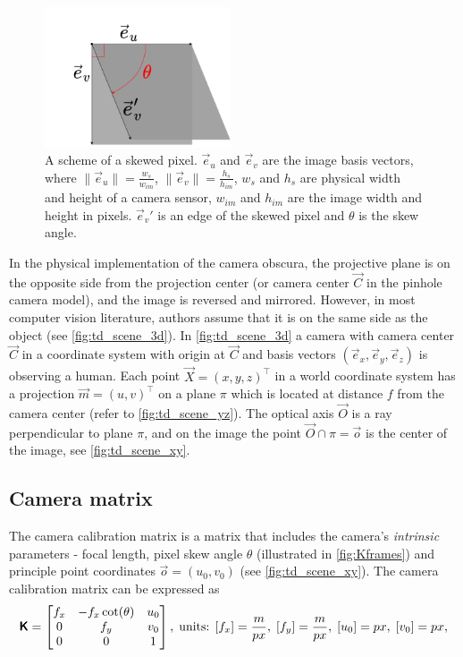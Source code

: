 \begin{figure}[ht]
  \centering
  \includegraphics[width=0.49\textwidth]{graphics/pixel.png}
  \caption[A scheme of a skewed pixel.]{A scheme of a skewed pixel. $\vec{e}_u$ and $\vec{e}_v$ are the image basis vectors, where $\lVert \vec{e}_u \rVert = \frac{w_s}{w_{im}}$, $\lVert \vec{e}_v \rVert = \frac{h_s}{h_{im}}$, $w_s$ and $h_s$ are physical width and height of a camera sensor, $w_{im}$ and $h_{im}$ are the image width and height in pixels. $\vec{e}_v'$ is an edge of the skewed pixel and $\theta$ is the skew angle.}
  \label{fig:Kframes}
\end{figure}

In the physical implementation of the camera obscura, the projective plane is on the opposite side from the projection center (or camera center $\vec{C}$ in the pinhole camera model), and the image is reversed and mirrored. 
However, in most computer vision literature, authors assume that it is on the same side as the object (see \autoref{fig:td_scene_3d}).
In \autoref{fig:td_scene_3d} a camera with camera center $\vec{C}$ in a coordinate system with origin at $\vec{C}$ and basis vectors $(\vec{e}_x, \vec{e}_y, \vec{e}_z)$ is observing a human. 
Each point $\vec{X} = (x, y, z)^\top$ in a world coordinate system has a projection $\vec{m} = (u, v)^\top$ on a plane $\pi$ which is located at distance $f$ from the camera center (refer to \autoref{fig:td_scene_yz}). 
The optical axis $\vec{O}$ is a ray perpendicular to plane $\pi$, and on the image the point $ \vec{O} \cap \pi = \vec{o}$ is the center of the image, see \autoref{fig:td_scene_xy}.

\subsection{Camera matrix}
The camera calibration matrix is a matrix that includes the camera's \textit{intrinsic} parameters - focal length, pixel skew angle $\theta$ (illustrated in \autoref{fig:Kframes}) and principle point coordinates $\vec{o} = (u_0, v_0)$ (see \autoref{fig:td_scene_xy}).
The camera calibration matrix can be expressed as
\begin{equation}
    \pmb{\mathsf{K}} = \begin{bmatrix}
        f_x & -f_x \cot(\theta) & u_0 \\
        0 & f_y & v_0 \\
        0 & 0 & 1 \\
    \end{bmatrix},
    \textrm{\;units: } [f_x]=\frac{m}{px},\; [f_y]=\frac{m}{px},\; [u_0]=px,\; [v_0]=px,
\end{equation}

